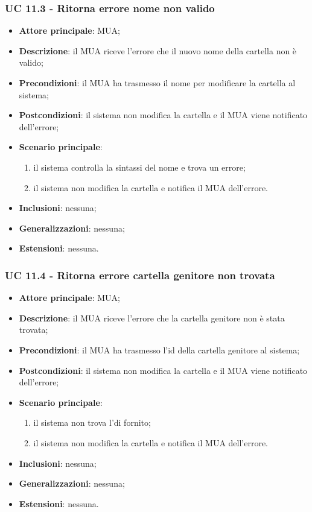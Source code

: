 \subsubsection{UC 11.3 - Ritorna errore nome non valido} \label{sec:UC11.3}
\begin{itemize}
    \item \textbf{Attore principale}: MUA;
    \item \textbf{Descrizione}: il MUA riceve l'errore che il nuovo nome della cartella non è valido;
    \item \textbf{Precondizioni}:  il MUA ha trasmesso il nome per modificare la cartella al sistema;
    \item \textbf{Postcondizioni}: il sistema non modifica la cartella e il MUA viene notificato dell'errore;
    \item \textbf{Scenario principale}:
        \begin{enumerate}
            \item il sistema controlla la sintassi del nome e trova un errore;
            \item il sistema non modifica la cartella e notifica il MUA dell'errore.
        \end{enumerate}
    \item \textbf{Inclusioni}: nessuna;
    \item \textbf{Generalizzazioni}: nessuna;
    \item \textbf{Estensioni}: nessuna.
\end{itemize}

\subsubsection{UC 11.4 - Ritorna errore cartella genitore non trovata} \label{sec:UC11.4}
\begin{itemize}
    \item \textbf{Attore principale}: MUA;
    \item \textbf{Descrizione}: il MUA riceve l'errore che la cartella genitore non è stata trovata;
    \item \textbf{Precondizioni}: il MUA ha trasmesso l'id della cartella genitore al sistema;
    \item \textbf{Postcondizioni}: il sistema non modifica la cartella e il MUA viene notificato dell'errore;
    \item \textbf{Scenario principale}:
        \begin{enumerate}
            \item il sistema non trova l'di fornito;
            \item il sistema non modifica la cartella e notifica il MUA dell'errore.
        \end{enumerate}
    \item \textbf{Inclusioni}: nessuna;
    \item \textbf{Generalizzazioni}: nessuna;
    \item \textbf{Estensioni}: nessuna.
\end{itemize}

